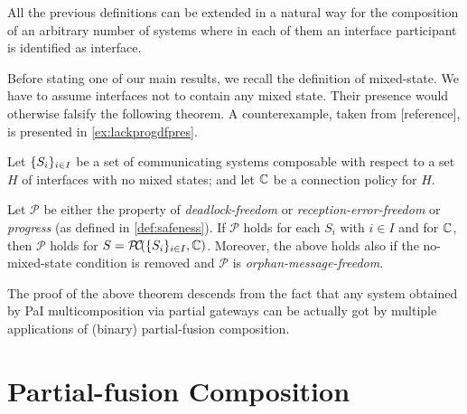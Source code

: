 
All the previous definitions can be extended in a natural way for the composition of
an arbitrary number of systems where in each of them an interface participant is
identified as interface.

Before stating one of our main results, we recall the definition of mixed-state.
We have to assume interfaces not to contain any mixed state. Their presence would otherwise
falsify the following theorem. A counterexample, taken from [reference],
is presented in \cref{ex:lackprogdfpres}.

\begin{theorem}
\label{th:paisafenesse}
 Let $\{S_i\}_{i\in I}$ be a set of communicating systems composable with respect to a set
 $H$ 
 of interfaces with no mixed states; %
 and let $\mathbb{C}$ be a connection policy for $H$. 


Let $\mathcal{P}$ be
either the property of {\em deadlock-freedom} or {\em reception-error-freedom} 
or {\em progress}
(as defined in \cref{def:safeness}).
If $\mathcal{P}$ holds for each $S_i$ with $i \in I$ 
and for $\mathbb{C}$, 
then $\mathcal{P}$ holds for $S  = \mathcal{P}\hspace{-2pt}\mathcal{C}\!(\{S_i\}_{i\in I}, \mathbb{C})$.
Moreover, the above holds also if the no-mixed-state condition is removed and
$\mathcal{P}$ is {\em orphan-message-freedom}.
\end{theorem}

The proof of the above theorem descends from the fact that any system obtained by 
PaI multicomposition via partial gateways can be actually got by multiple applications of
(binary) partial-fusion composition. 


\section{Partial-fusion Composition}



